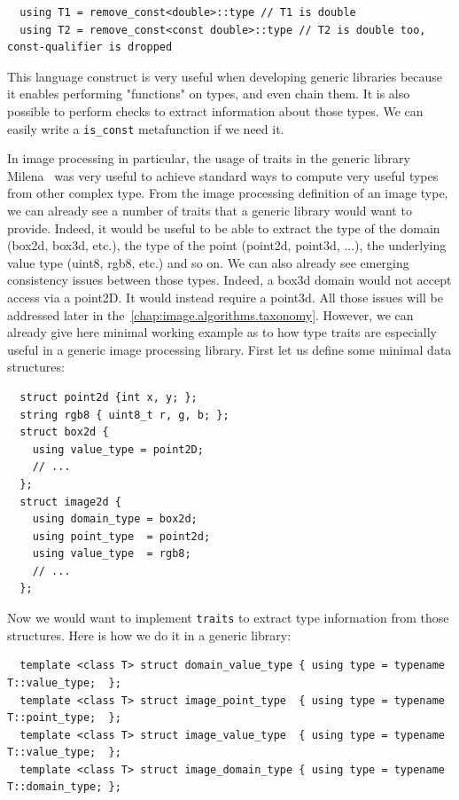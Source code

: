 \begin{verbatim}
  using T1 = remove_const<double>::type // T1 is double
  using T2 = remove_const<const double>::type // T2 is double too, const-qualifier is dropped
\end{verbatim}

This language construct is very useful when developing generic libraries because it enables performing "functions" on
types, and even chain them. It is also possible to perform checks to extract information about those types. We can
easily write a \texttt{is\_const} metafunction if we need it.

In image processing in particular, the usage of traits in the generic library
Milena~\parencite{levillain.2009.ismm,levillain.2010.icip} was very useful to achieve standard ways to compute very
useful types from other complex type. From the image processing definition of an image type, we can already see a number
of traits that a generic library would want to provide. Indeed, it would be useful to be able to extract the type of the
domain (box2d, box3d, etc.), the type of the point (point2d, point3d, ...), the underlying value type (uint8, rgb8,
etc.) and so on. We can also already see emerging consistency issues between those types. Indeed, a box3d domain would
not accept access via a point2D. It would instead require a point3d. All those issues will be addressed later in
the~\cref{chap:image.algorithms.taxonomy}. However, we can already give here minimal working example as to how type
traits are especially useful in a generic image processing library. First let us define some minimal data structures:

\begin{verbatim}
  struct point2d {int x, y; };
  string rgb8 { uint8_t r, g, b; };
  struct box2d {
    using value_type = point2D;
    // ...
  };
  struct image2d {
    using domain_type = box2d;
    using point_type  = point2d;
    using value_type  = rgb8;
    // ...
  };
\end{verbatim}

Now we would want to implement \texttt{traits} to extract type information from those structures. Here is how we do it
in a generic library:

\begin{verbatim}
  template <class T> struct domain_value_type { using type = typename T::value_type;  };
  template <class T> struct image_point_type  { using type = typename T::point_type;  };
  template <class T> struct image_value_type  { using type = typename T::value_type;  };
  template <class T> struct image_domain_type { using type = typename T::domain_type; };
\end{verbatim}

